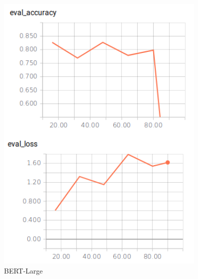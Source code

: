 \begin{figure}
\begin{minipage}{0.30\textwidth}
        \includegraphics[width=0.9\textwidth]{figures/tensorboard_askubuntu_large.png}
        \caption{BERT-Large}
        \label{fig:tensorboard_large}
    \end{minipage}
    \hspace*{3mm}
    \begin{minipage}{0.30\textwidth}

\end{minipage}
\end{figure}
